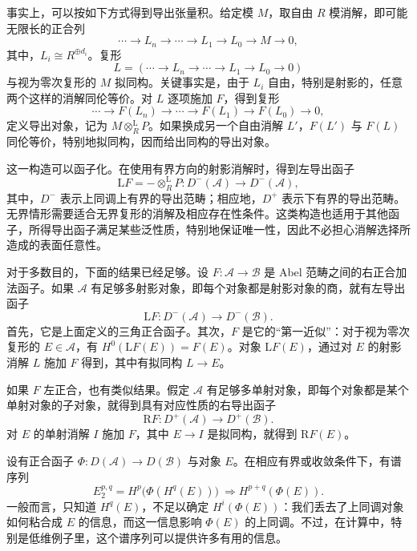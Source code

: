 事实上，可以按如下方式得到导出张量积。给定模 $M$，取自由 $R$ 模消解，即可能无限长的正合列
\[
\cdots\longrightarrow L_n\longrightarrow\cdots\longrightarrow L_1
\longrightarrow L_0\longrightarrow M\longrightarrow0,
\]
其中，$L_i\cong R^{\oplus d_i}$。复形
\[
L=(\cdots\longrightarrow L_n\longrightarrow\cdots
\longrightarrow L_1\longrightarrow L_0\longrightarrow0)
\]
与视为零次复形的 $M$ 拟同构。关键事实是，由于 $L_i$ 自由，特别是射影的，任意两个这样的消解同伦等价。对 $L$ 逐项施加 $F$，得到复形
\[
\cdots\longrightarrow F(L_n)\longrightarrow\cdots
\longrightarrow F(L_1)\longrightarrow F(L_0)\longrightarrow0,
\]
定义导出对象，记为 $M\otimes_R^{\mathrm{L}}P$。如果换成另一个自由消解 $L'$，$F(L')$ 与 $F(L)$ 同伦等价，特别地拟同构，因而给出同构的导出对象。

这一构造可以函子化。在使用有界方向的射影消解时，得到左导出函子
\[
\mathrm{L}F=-\otimes_R^{\mathrm{L}}P
\colon D^-(\mathcal{A})\longrightarrow D^-(\mathcal{A}),
\]
其中，$D^-$ 表示上同调上有界的导出范畴；相应地，$D^+$ 表示下有界的导出范畴。无界情形需要适合无界复形的消解及相应存在性条件。这类构造也适用于其他函子，所得导出函子满足某些泛性质，特别地保证唯一性，因此不必担心消解选择所造成的表面任意性。

对于多数目的，下面的结果已经足够。设 $F\colon\mathcal{A}\to\mathcal{B}$ 是 Abel 范畴之间的右正合加法函子。如果 $\mathcal{A}$ 有足够多射影对象，即每个对象都是射影对象的商，就有左导出函子
\[
\mathrm{L}F\colon D^-(\mathcal{A})\longrightarrow D^-(\mathcal{B}).
\]
首先，它是上面定义的三角正合函子。其次，$F$ 是它的“第一近似”：对于视为零次复形的 $E\in\mathcal{A}$，有 $H^0(\mathrm{L}F(E))=F(E)$。对象 $\mathrm{L}F(E)$，通过对 $E$ 的射影消解 $L$ 施加 $F$ 得到，其中有拟同构 $L\to E$。

如果 $F$ 左正合，也有类似结果。假定 $\mathcal{A}$ 有足够多单射对象，即每个对象都是某个单射对象的子对象，就得到具有对应性质的右导出函子
\[
\mathrm{R}F\colon D^+(\mathcal{A})\longrightarrow D^+(\mathcal{B}).
\]
对 $E$ 的单射消解 $I$ 施加 $F$，其中 $E\to I$ 是拟同构，就得到 $\mathrm{R}F(E)$。

设有正合函子 $\Phi\colon D(\mathcal{A})\to D(\mathcal{B})$ 与对象 $E$。在相应有界或收敛条件下，有谱序列
\[
E_2^{p,q}=H^p\bigl(\Phi(H^q(E))\bigr)
\ \Longrightarrow H^{p+q}(\Phi(E)).
\]
一般而言，只知道 $H^q(E)$，不足以确定 $H^i(\Phi(E))$：我们丢去了上同调对象如何粘合成 $E$ 的信息，而这一信息影响 $\Phi(E)$ 的上同调。不过，在计算中，特别是低维例子里，这个谱序列可以提供许多有用的信息。

